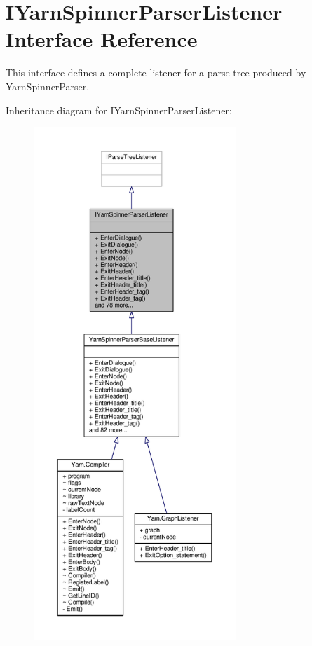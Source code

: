 \hypertarget{a00120}{\section{I\-Yarn\-Spinner\-Parser\-Listener Interface Reference}
\label{a00120}
}


This interface defines a complete listener for a parse tree produced by Yarn\-Spinner\-Parser.  




Inheritance diagram for I\-Yarn\-Spinner\-Parser\-Listener\-:
\nopagebreak
\begin{figure}[H]
\begin{center}
\leavevmode
\includegraphics[height=550pt]{a00373}
\end{center}
\end{figure}


